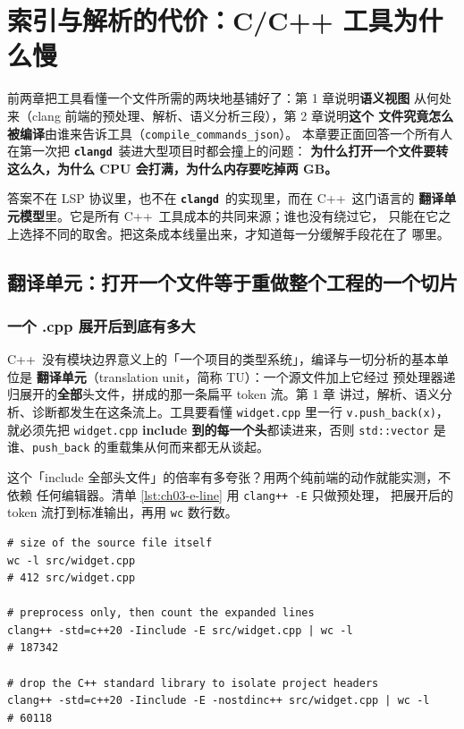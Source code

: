 \documentclass[12pt,a4paper,fontset=fandol]{ctexbook}
\newcommand{\Lib}[1]{\textbf{\texttt{#1}}}
\newcommand{\Lang}[1]{\textsf{#1}}
\newcommand{\CPP}{\Lang{C++}}
\newcommand{\CD}{\Lib{clangd}}
\begin{document}
\chapter{索引与解析的代价：C\allowbreak/\allowbreak C++ 工具为什么慢}
\label{ch:indexing-cost}

前两章把工具看懂一个文件所需的两块地基铺好了：第 1 章说明\textbf{语义视图}
从何处来（clang 前端的预处理、解析、语义分析三段），第 2 章说明\textbf{这个
文件究竟怎么被编译}由谁来告诉工具（\texttt{compile\_\allowbreak commands\_\allowbreak json}）。
本章要正面回答一个所有人在第一次把 \CD\ 装进大型项目时都会撞上的问题：
\textbf{为什么打开一个文件要转这么久，为什么 CPU 会打满，为什么内存要吃掉两
GB。}

答案不在 LSP 协议里，也不在 \CD\ 的实现里，而在 \CPP\ 这门语言的
\textbf{翻译单元模型}里。它是所有 \CPP\ 工具成本的共同来源；谁也没有绕过它，
只能在它之上选择不同的取舍。把这条成本线量出来，才知道每一分缓解手段花在了
哪里。

\section{翻译单元：打开一个文件等于重做整个工程的一个切片}
\label{sec:ch03-s1}

\subsection*{一个 .cpp 展开后到底有多大}

\CPP\ 没有模块边界意义上的「一个项目的类型系统」，编译与一切分析的基本单位是
\textbf{翻译单元}（translation unit，简称 TU）：一个源文件加上它经过
预处理器递归展开的\textbf{全部}头文件，拼成的那一条扁平 token 流。第 1 章
讲过，解析、语义分析、诊断都发生在这条流上。工具要看懂
\texttt{widget.cpp} 里一行 \texttt{v.push\_back(x)}，就必须先把
\texttt{widget.cpp} \textbf{include 到的每一个头}都读进来，否则
\texttt{std::vector} 是谁、\texttt{push\_back} 的重载集从何而来都无从谈起。

这个「include 全部头文件」的倍率有多夸张？用两个纯前端的动作就能实测，不依赖
任何编辑器。清单 \ref{lst:ch03-e-line} 用 \texttt{clang++ -E} 只做预处理，
把展开后的 token 流打到标准输出，再用 \texttt{wc} 数行数。

\begin{lstlisting}[style=shellstyle,caption={用 -E 的行数实测 include 的倍率},label={lst:ch03-e-line}]
# size of the source file itself
wc -l src/widget.cpp
# 412 src/widget.cpp

# preprocess only, then count the expanded lines
clang++ -std=c++20 -Iinclude -E src/widget.cpp | wc -l
# 187342

# drop the C++ standard library to isolate project headers
clang++ -std=c++20 -Iinclude -E -nostdinc++ src/widget.cpp | wc -l
# 60118
\end{lstlisting}
\end{document}
